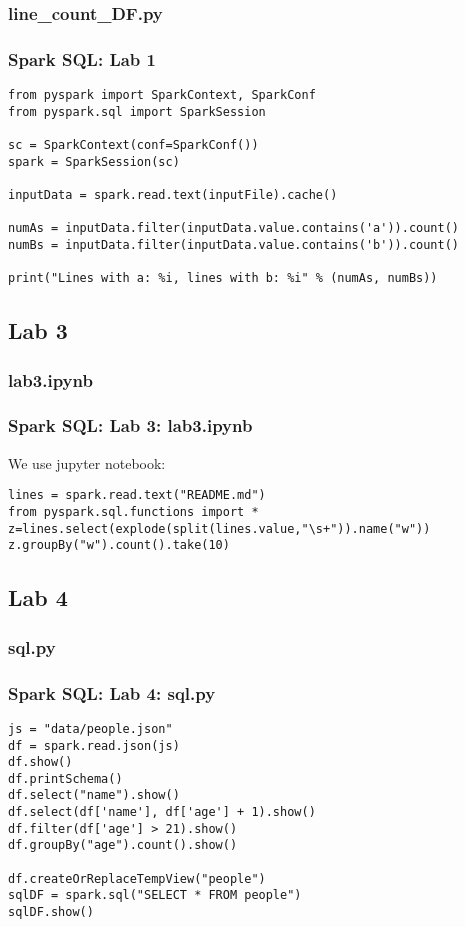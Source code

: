 \documentclass{beamer}
\begin{document}
\subsubsection{line\_count\_DF.py}
\begin{frame}[fragile]
  \frametitle{Spark SQL: Lab 1}
{\small
{\color{mycolorcode}
\begin{verbatim}
from pyspark import SparkContext, SparkConf
from pyspark.sql import SparkSession

sc = SparkContext(conf=SparkConf())
spark = SparkSession(sc)

inputData = spark.read.text(inputFile).cache()

numAs = inputData.filter(inputData.value.contains('a')).count()
numBs = inputData.filter(inputData.value.contains('b')).count()

print("Lines with a: %i, lines with b: %i" % (numAs, numBs))
\end{verbatim}
}
}
\end{frame}

\subsection{Lab 3}
\subsubsection{lab3.ipynb}
\begin{frame}[fragile]
  \frametitle{Spark SQL: Lab 3: lab3.ipynb}
  We use jupyter notebook:
{\color{mycolorcode}
\begin{verbatim}
lines = spark.read.text("README.md") 
from pyspark.sql.functions import *
z=lines.select(explode(split(lines.value,"\s+")).name("w"))
z.groupBy("w").count().take(10)
\end{verbatim}
}
\end{frame}


\subsection{Lab 4}
\subsubsection{sql.py}
\begin{frame}[fragile]
  \frametitle{Spark SQL: Lab 4: sql.py}
{\color{mycolorcode}
\begin{verbatim}
js = "data/people.json"
df = spark.read.json(js)
df.show()
df.printSchema()
df.select("name").show()
df.select(df['name'], df['age'] + 1).show()
df.filter(df['age'] > 21).show()
df.groupBy("age").count().show()

df.createOrReplaceTempView("people")
sqlDF = spark.sql("SELECT * FROM people")
sqlDF.show()
\end{verbatim}
}
\end{frame}
\end{document}
